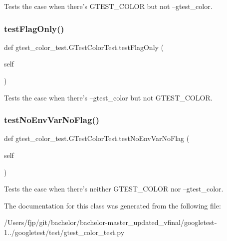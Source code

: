 \begin{DoxyVerb}Tests the case when there's GTEST_COLOR but not --gtest_color.\end{DoxyVerb}
 \mbox{\label{classgtest__color__test_1_1_g_test_color_test_abc4c056b8e703e83516f9e5aea8dd25d}} 
\subsubsection{\texorpdfstring{test\+Flag\+Only()}{testFlagOnly()}}
{\footnotesize\ttfamily def gtest\+\_\+color\+\_\+test.\+G\+Test\+Color\+Test.\+test\+Flag\+Only (\begin{DoxyParamCaption}\item[{}]{self }\end{DoxyParamCaption})}

\begin{DoxyVerb}Tests the case when there's --gtest_color but not GTEST_COLOR.\end{DoxyVerb}
 \mbox{\label{classgtest__color__test_1_1_g_test_color_test_a22bf83ab416dc3ccd3c1b771ff74022c}} 
\subsubsection{\texorpdfstring{test\+No\+Env\+Var\+No\+Flag()}{testNoEnvVarNoFlag()}}
{\footnotesize\ttfamily def gtest\+\_\+color\+\_\+test.\+G\+Test\+Color\+Test.\+test\+No\+Env\+Var\+No\+Flag (\begin{DoxyParamCaption}\item[{}]{self }\end{DoxyParamCaption})}

\begin{DoxyVerb}Tests the case when there's neither GTEST_COLOR nor --gtest_color.\end{DoxyVerb}
 

The documentation for this class was generated from the following file\+:\begin{DoxyCompactItemize}
\item 
/\+Users/fjp/git/bachelor/bachelor-\/master\+\_\+updated\+\_\+vfinal/googletest-\/1../googletest/test/gtest\+\_\+color\+\_\+test.\+py\end{DoxyCompactItemize}
